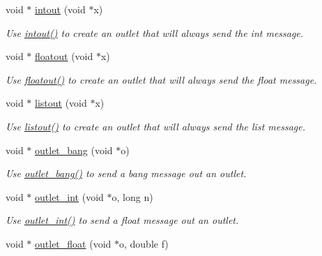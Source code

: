 \begin{DoxyCompactItemize}
void $\ast$ \hyperlink{group__inout_ga9b8d897c728eeafa5638d4fc16ff704e}{intout} (void $\ast$x)
\begin{DoxyCompactList}\small\item\em Use \hyperlink{group__inout_ga9b8d897c728eeafa5638d4fc16ff704e}{intout()} to create an outlet that will always send the int message. \item\end{DoxyCompactList}\item 
void $\ast$ \hyperlink{group__inout_ga0881da69192bb254b8c0bf767c657461}{floatout} (void $\ast$x)
\begin{DoxyCompactList}\small\item\em Use \hyperlink{group__inout_ga0881da69192bb254b8c0bf767c657461}{floatout()} to create an outlet that will always send the float message. \item\end{DoxyCompactList}\item 
void $\ast$ \hyperlink{group__inout_ga47841be73d0c90978da818f0f7c899eb}{listout} (void $\ast$x)
\begin{DoxyCompactList}\small\item\em Use \hyperlink{group__inout_ga47841be73d0c90978da818f0f7c899eb}{listout()} to create an outlet that will always send the list message. \item\end{DoxyCompactList}\item 
void $\ast$ \hyperlink{group__inout_ga357498d7143fd266facfbfc4efa59029}{outlet\_\-bang} (void $\ast$o)
\begin{DoxyCompactList}\small\item\em Use \hyperlink{group__inout_ga357498d7143fd266facfbfc4efa59029}{outlet\_\-bang()} to send a bang message out an outlet. \item\end{DoxyCompactList}\item 
void $\ast$ \hyperlink{group__inout_ga0b2b38216f2f4dba486bfcd2273f255e}{outlet\_\-int} (void $\ast$o, long n)
\begin{DoxyCompactList}\small\item\em Use \hyperlink{group__inout_ga0b2b38216f2f4dba486bfcd2273f255e}{outlet\_\-int()} to send a float message out an outlet. \item\end{DoxyCompactList}\item 
void $\ast$ \hyperlink{group__inout_gafbb3f62a413f05a394391afde5b3c30f}{outlet\_\-float} (void $\ast$o, double f)

\end{DoxyCompactItemize}
